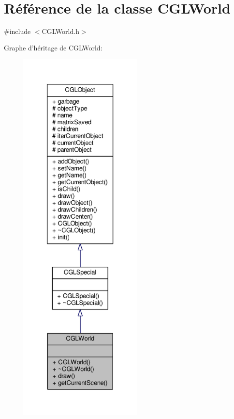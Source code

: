 \hypertarget{class_c_g_l_world}{\section{Référence de la classe C\-G\-L\-World}
\label{class_c_g_l_world}
}


{\ttfamily \#include $<$C\-G\-L\-World.\-h$>$}



Graphe d'héritage de C\-G\-L\-World\-:\nopagebreak
\begin{figure}[H]
\begin{center}
\leavevmode
\includegraphics[height=550pt]{df/d12/class_c_g_l_world__inherit__graph}
\end{center}
\end{figure}


